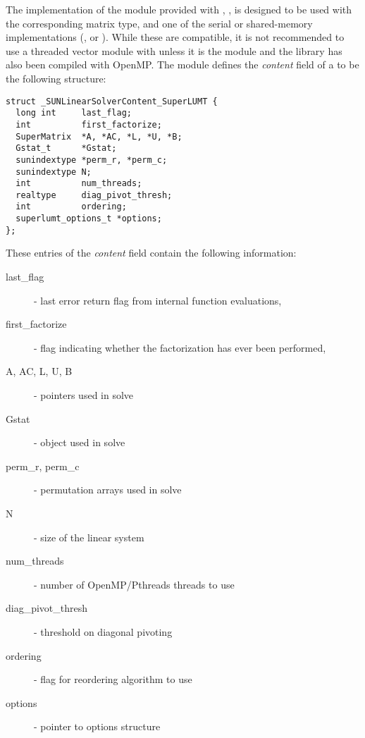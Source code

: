 
The {\superlumt} implementation of the {\sunlinsol} module provided with
{\sundials}, {\sunlinsolslumt}, is designed to be used with the
corresponding {\sunmatsparse} matrix type, and one of the serial or
shared-memory {\nvector} implementations ({\nvecs}, {\nvecopenmp} or 
{\nvecpthreads}).  While these are compatible, it is not recommended
to use a threaded vector module with {\sunlinsolslumt} unless it is
the {\nvecopenmp} module and the {\superlumt} library has also been
compiled with OpenMP. The {\sunlinsolslumt} module defines the {\em
content} field of a  to be the following structure:
\begin{verbatim} 
struct _SUNLinearSolverContent_SuperLUMT {
  long int     last_flag;
  int          first_factorize;
  SuperMatrix  *A, *AC, *L, *U, *B;
  Gstat_t      *Gstat;
  sunindextype *perm_r, *perm_c;
  sunindextype N;
  int          num_threads;
  realtype     diag_pivot_thresh; 
  int          ordering;
  superlumt_options_t *options;
};
\end{verbatim}
These entries of the \emph{content} field contain the following
information:
\begin{description}
  \item[last\_flag] - last error return flag from internal function evaluations,
  \item[first\_factorize] - flag indicating whether the factorization
    has ever been performed, 
  \item[A, AC, L, U, B] -  pointers used in solve
  \item[Gstat] -  object used in solve
  \item[perm\_r, perm\_c] - permutation arrays used in solve
  \item[N] - size of the linear system
  \item[num\_threads] - number of OpenMP/Pthreads threads to use
  \item[diag\_pivot\_thresh] - threshold on diagonal pivoting
  \item[ordering] - flag for reordering algorithm to use
  \item[options] - pointer to {\superlumt} options structure
\end{description}

